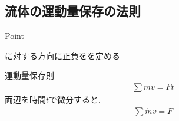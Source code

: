 \documentclass[a4paper]{jsarticle}
\begin{document}
\subsection{流体の運動量保存の法則}
\begin{itembox}[l]{Point}
    \begin{center}
        に対する方向に正負をを定める\\
    \end{center}
\end{itembox}
\begin{itembox}[l]{運動量保存則}
    \begin{eqnarray*}
        \displaystyle\sum mv=Ft
    \end{eqnarray*}
    両辺を時間$t$で微分すると,
    \begin{eqnarray*}
        \displaystyle\sum \dot{m}v=F\\
    \end{eqnarray*}
\end{itembox}
\end{document}
